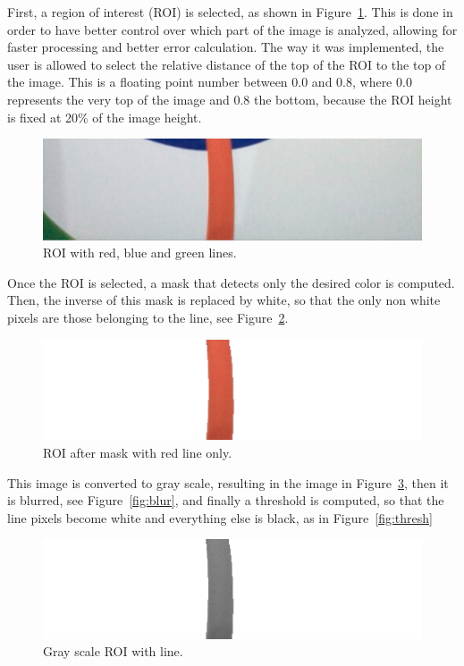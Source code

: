\documentclass[10pt,conference,compsoc]{IEEEtran}
\begin{document}
First, a region of interest (ROI) is selected, as shown in Figure~\ref{fig:roi}. This is done in order to have better control over which part of the image is analyzed, allowing for faster processing and better error calculation. The way it was implemented, the user is allowed to select the relative distance of the top of the ROI to the top of the image. This is a floating point number between 0.0 and 0.8, where 0.0 represents the very top of the image and 0.8 the bottom, because the ROI height is fixed at 20\% of the image height.

\begin{figure}[thpb]
\centering
\includegraphics[scale=0.4]{img/roi.png}
\caption{ROI with red, blue and green lines.}
\label{fig:roi}
\end{figure}

Once the ROI is selected, a mask that detects only the desired color is computed. Then, the inverse of this mask is replaced by white, so that the only non white pixels are those belonging to the line, see Figure~\ref{fig:mask}.

\begin{figure}[thpb]
\centering
\includegraphics[scale=0.4]{img/mask.png}
\caption{ROI after mask with red line only.}
\label{fig:mask}
\end{figure}

This image is converted to gray scale, resulting in the image in Figure~\ref{fig:mono}, then it is blurred, see Figure~\ref{fig:blur}, and finally a threshold is computed, so that the line pixels become white and everything else is black, as in Figure~\ref{fig:thresh}

\begin{figure}[thpb]
\centering
\includegraphics[scale=0.4]{img/mono.png}
\caption{Gray scale ROI with line.}
\label{fig:mono}
\end{figure}
\end{document}
